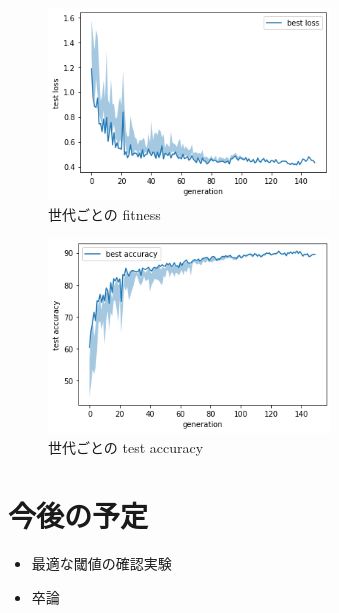 \documentclass[twocolumn]{jarticle}     %
\begin{document}
\begin{figure}[tb]
  \begin{center}
    \includegraphics[clip,width=75mm]{loss.png}
    \caption{世代ごとの fitness}
    \label{fig:fit}
  \end{center}
\end{figure}

\begin{figure}[tb]
  \begin{center}
    \includegraphics[clip,width=75mm]{acc.png}
    \caption{世代ごとの test accuracy}
    \label{fig:acc}
  \end{center}
\end{figure}


\section{今後の予定}
\begin{itemize}
  \item 最適な閾値の確認実験
  \item 卒論

\end{itemize}



\end{document}
